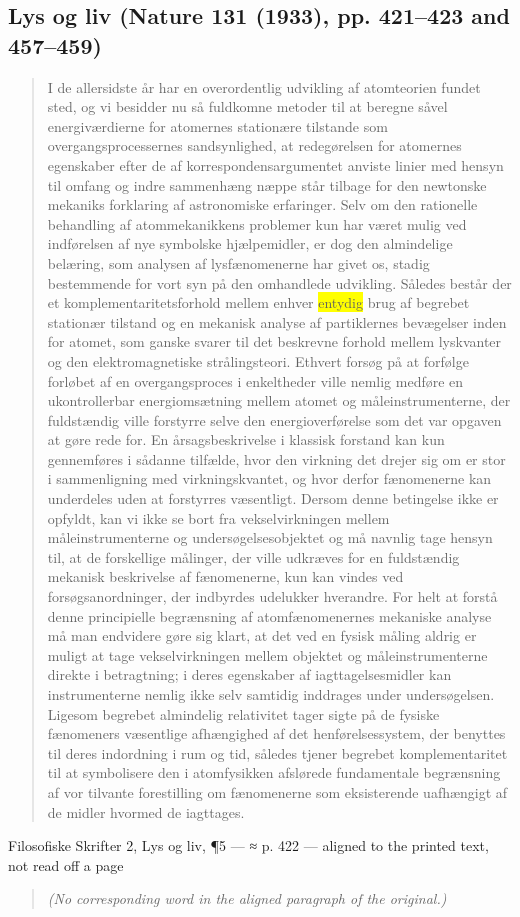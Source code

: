 \documentclass[11pt]{article}
\newcommand{\dcite}[1]{{\nopagebreak\raggedleft\small #1\par}\medskip}
\newcommand{\tlg}[1]{{\setlength{\fboxsep}{0.8pt}\colorbox{yellow}{#1}}}
\begin{document}
\subsection{Lys og liv \normalfont(Nature 131 (1933), pp. 421–423 and 457–459)}

\begin{quote}
I de allersidste år har en overordentlig udvikling af atomteorien fundet sted, og vi besidder nu så fuldkomne metoder til at beregne såvel energiværdierne for atomernes stationære tilstande som overgangsprocessernes sandsynlighed, at redegørelsen for atomernes egenskaber efter de af korrespondensargumentet anviste linier med hensyn til omfang og indre sammenhæng næppe står tilbage for den newtonske mekaniks forklaring af astronomiske erfaringer. Selv om den rationelle behandling af atommekanikkens problemer kun har været mulig ved indførelsen af nye symbolske hjælpemidler, er dog den almindelige belæring, som analysen af lysfænomenerne har givet os, stadig bestemmende for vort syn på den omhandlede udvikling. Således består der et komplementaritetsforhold mellem enhver \tlg{entydig} brug af begrebet stationær tilstand og en mekanisk analyse af partiklernes bevægelser inden for atomet, som ganske svarer til det beskrevne forhold mellem lyskvanter og den elektromagnetiske strålingsteori. Ethvert forsøg på at forfølge forløbet af en overgangsproces i enkeltheder ville nemlig medføre en ukontrollerbar energiomsætning mellem atomet og måleinstrumenterne, der fuldstændig ville forstyrre selve den energioverførelse som det var opgaven at gøre rede for. En årsagsbeskrivelse i klassisk forstand kan kun gennemføres i sådanne tilfælde, hvor den virkning det drejer sig om er stor i sammenligning med virkningskvantet, og hvor derfor fænomenerne kan underdeles uden at forstyrres væsentligt. Dersom denne betingelse ikke er opfyldt, kan vi ikke se bort fra vekselvirkningen mellem måleinstrumenterne og undersøgelsesobjektet og må navnlig tage hensyn til, at de forskellige målinger, der ville udkræves for en fuldstændig mekanisk beskrivelse af fænomenerne, kun kan vindes ved forsøgsanordninger, der indbyrdes udelukker hverandre. For helt at forstå denne principielle begrænsning af atomfænomenernes mekaniske analyse må man endvidere gøre sig klart, at det ved en fysisk måling aldrig er muligt at tage vekselvirkningen mellem objektet og måleinstrumenterne direkte i betragtning; i deres egenskaber af iagttagelsesmidler kan instrumenterne nemlig ikke selv samtidig inddrages under undersøgelsen. Ligesom begrebet almindelig relativitet tager sigte på de fysiske fænomeners væsentlige afhængighed af det henførelsessystem, der benyttes til deres indordning i rum og tid, således tjener begrebet komplementaritet til at symbolisere den i atomfysikken afslørede fundamentale begrænsning af vor tilvante forestilling om fænomenerne som eksisterende uafhængigt af de midler hvormed de iagttages.
\end{quote}
\dcite{Filosofiske Skrifter 2, Lys og liv, ¶5 — ≈ p. 422 — aligned to the printed text, not read off a page}
{\footnotesize\begin{quote}\itshape (No corresponding word in the aligned paragraph of the original.)\end{quote}}
\end{document}
